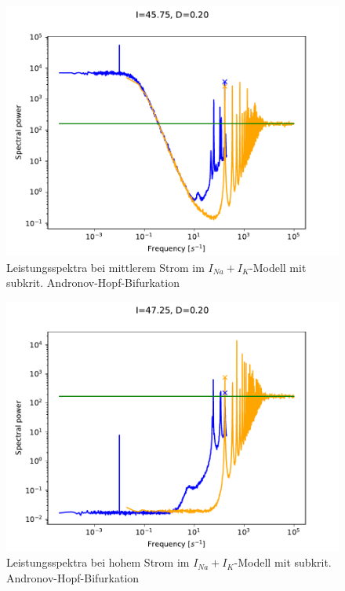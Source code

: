 \documentclass[12pt,a4paper]{article}
\begin{document}
\begin{figure}[H]
	\centering
	\includegraphics[scale=1]{twofoud20i4575ws.pdf}\caption{Leistungsspektra bei mittlerem Strom im $I_{Na}+I_K$-Modell mit subkrit. Andronov-Hopf-Bifurkation}
	\label{twofoud20medium}
\end{figure}
\begin{figure}[H]
	\centering
	\includegraphics[scale=1]{twofoud20i4725ws.pdf}\caption{Leistungsspektra bei hohem Strom im $I_{Na}+I_K$-Modell mit subkrit. Andronov-Hopf-Bifurkation}
	\label{twofoud20large}
\end{figure}
\end{document}
